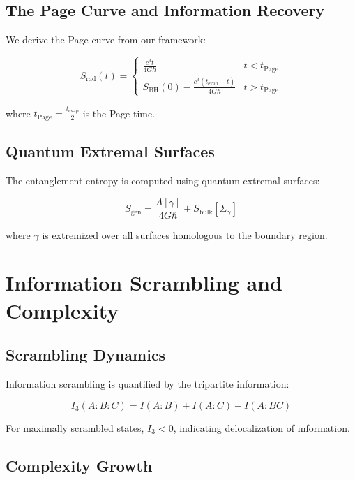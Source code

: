 \documentclass[12pt,a4paper]{article}
\begin{document}
\subsection{The Page Curve and Information Recovery}

We derive the Page curve from our framework:

\begin{equation}
S_{\text{rad}}(t) = \begin{cases}
\frac{c^3 t}{4G\hbar} & t < t_{\text{Page}} \\
S_{\text{BH}}(0) - \frac{c^3(t_{\text{evap}} - t)}{4G\hbar} & t > t_{\text{Page}}
\end{cases}
\end{equation}

where $t_{\text{Page}} = \frac{t_{\text{evap}}}{2}$ is the Page time.

\subsection{Quantum Extremal Surfaces}

The entanglement entropy is computed using quantum extremal surfaces:

\begin{equation}
S_{\text{gen}} = \frac{A[\gamma]}{4G\hbar} + S_{\text{bulk}}[\Sigma_\gamma]
\end{equation}

where $\gamma$ is extremized over all surfaces homologous to the boundary region.

\section{Information Scrambling and Complexity}

\subsection{Scrambling Dynamics}

Information scrambling is quantified by the tripartite information:

\begin{equation}
I_3(A:B:C) = I(A:B) + I(A:C) - I(A:BC)
\end{equation}

For maximally scrambled states, $I_3 < 0$, indicating delocalization of information.

\subsection{Complexity Growth}
\end{document}
